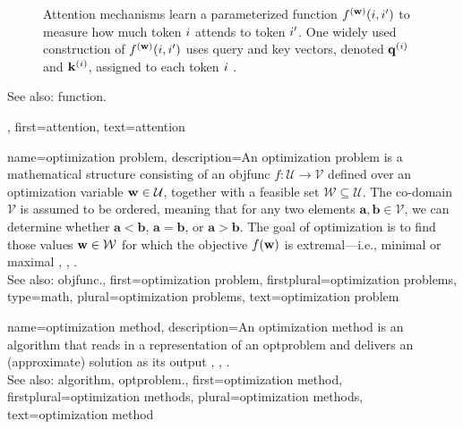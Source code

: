{{\begin{figure}[H]
			\caption{Attention mechanisms learn a parameterized \gls{function} $f^{({\bf w})}(i,i')$ to measure 
			how much token $i$ attends to token $i'$. One widely used construction of $f^{({\bf w})}(i,i')$ 
			uses query and key \glspl{vector}, denoted ${\bf q}^{(i)}$ and ${\bf k}^{(i)}$, assigned to each token $i$ \cite{vaswani2017attention}.}
		\end{figure}
		See also: \gls{function}.},
	first={attention},
	text={attention}
}


{name={optimization problem}, 
	description={An optimization problem is a mathematical 
		   structure consisting of an \gls{objfunc} $f: \mathcal{U} \rightarrow \mathcal{V}$ 
		   defined over an optimization variable ${\bf w} \in \mathcal{U}$, together with a 
		   feasible set $\mathcal{W} \subseteq \mathcal{U}$. The co-domain $\mathcal{V}$ is 
		   assumed to be ordered, meaning that for any two elements $\mathbf{a}, \mathbf{b} \in \mathcal{V}$, 
		   we can determine whether $\mathbf{a} < \mathbf{b}$, $\mathbf{a} = \mathbf{b}$, 
		   or $\mathbf{a} > \mathbf{b}$. The goal of optimization is to find those values ${\bf w} \in \mathcal{W}$ 
		   for which the objective $f({\bf w})$ is extremal—i.e., minimal or maximal \cite{BoydConvexBook}, \cite{BertsekasNonLinProgr}, \cite{nesterov04}.
		   \\
		   See also: \gls{objfunc}.},
	first={optimization problem},
	firstplural={optimization problems}, 
	type=math,
	plural={optimization problems}, 
	text={optimization problem}
}

{name={optimization method},
	description={An optimization method is an \gls{algorithm} that 
		reads in a representation of an \gls{optproblem} and delivers an (approximate) solution 
		as its output \cite{BoydConvexBook}, \cite{BertsekasNonLinProgr}, \cite{nesterov04}.
		 \\
		 See also: \gls{algorithm}, \gls{optproblem}.},
	first={optimization method},
	firstplural={optimization methods}, 
	plural={optimization methods}, 
	text={optimization method}
}

